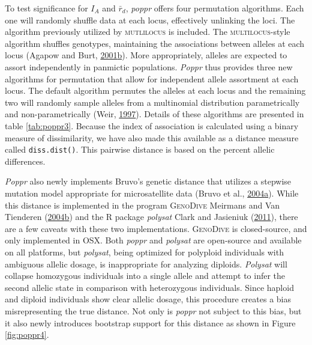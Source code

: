\documentclass[double,12pt]{beavtex}
\begin{document}
  To test significance for \(I_A\) and \(\bar{r}_d\), \emph{poppr} offers
  four permutation algorithms. Each one will randomly shuffle data at each
  locus, effectively unlinking the loci. The algorithm previously utilized
  by \textsc{mutlilocus} is included. The \textsc{multilocus}-style
  algorithm shuffles genotypes, maintaining the associations between
  alleles at each locus (Agapow and Burt,
  \protect\hyperlink{ref-Agapow:2001}{2001}\protect\hyperlink{ref-Agapow:2001}{b}).
  More appropriately, alleles are expected to assort independently in
  panmictic populations. \emph{Poppr} thus provides three new algorithms
  for permutation that allow for independent allele assortment at each
  locus. The default algorithm permutes the alleles at each locus and the
  remaining two will randomly sample alleles from a multinomial
  distribution parametrically and non-parametrically (Weir,
  \protect\hyperlink{ref-Weir_1997}{1997}). Details of these algorithms
  are presented in table \ref{tab:poppr3}. Because the index of
  association is calculated using a binary measure of dissimilarity, we
  have also made this available as a distance measure called
  \texttt{diss.dist()}. This pairwise distance is based on the percent
  allelic differences.
  
  \emph{Poppr} also newly implements Bruvo's genetic distance that
  utilizes a stepwise mutation model appropriate for microsatellite data
  (Bruvo et al.,
  \protect\hyperlink{ref-Bruvo:2004}{2004}\protect\hyperlink{ref-Bruvo:2004}{a}).
  While this distance is implemented in the program \textsc{ GenoDive}
  Meirmans and Van Tienderen
  (\protect\hyperlink{ref-genodive}{2004}\protect\hyperlink{ref-genodive}{b})
  and the R package \emph{polysat} Clark and Jasieniuk
  (\protect\hyperlink{ref-polysat}{2011}), there are a few caveats with
  these two implementations. \textsc{GenoDive} is closed-source, and only
  implemented in OSX. Both \emph{poppr} and \emph{polysat} are open-source
  and available on all platforms, but \emph{polysat}, being optimized for
  polyploid individuals with ambiguous allelic dosage, is inappropriate
  for analyzing diploids. \emph{Polysat} will collapse homozygous
  individuals into a single allele and attempt to infer the second allelic
  state in comparison with heterozygous individuals. Since haploid and
  diploid individuals show clear allelic dosage, this procedure creates a
  bias misrepresenting the true distance. Not only is \emph{poppr} not
  subject to this bias, but it also newly introduces bootstrap support for
  this distance as shown in Figure \ref{fig:poppr4}.
  
\end{document}
